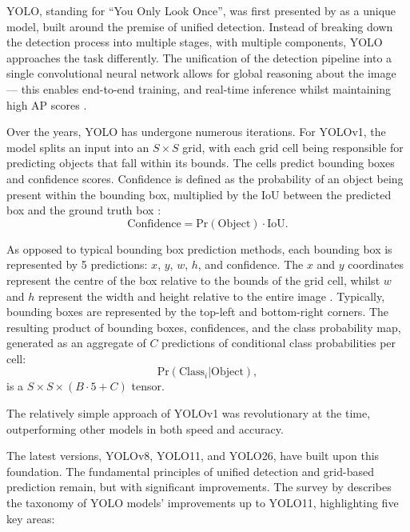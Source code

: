 YOLO, standing for \enquote{You Only Look Once}, was first presented by
\citet{redmon2016lookonceunifiedrealtime} as a unique model, built around the
premise of unified detection. Instead of breaking down the detection process
into multiple stages, with multiple components, YOLO approaches the task
differently. The unification of the detection pipeline into a single
convolutional neural network allows for global reasoning about the image ---
this enables end-to-end training, and real-time inference whilst maintaining
high AP scores \citep{redmon2016lookonceunifiedrealtime}.

Over the years, YOLO has undergone numerous iterations. For YOLOv1, the model
splits an input into an $S \times S$ grid, with each grid cell being
responsible for predicting objects that fall within its bounds. The cells
predict bounding boxes and confidence scores. Confidence is defined as the
probability of an object being present within the bounding box, multiplied by
the IoU between the predicted box and the ground truth box
\citep{redmon2016lookonceunifiedrealtime}: $$\textrm{Confidence} =
	\textrm{Pr}(\textrm{Object}) \cdot \textrm{IoU}.$$

As opposed to typical bounding box prediction methods, each bounding box is
represented by 5 predictions: $x$, $y$, $w$, $h$, and confidence. The $x$ and
$y$ coordinates represent the centre of the box relative to the bounds of the
grid cell, whilst $w$ and $h$ represent the width and height relative to the
entire image \citep{redmon2016lookonceunifiedrealtime}. Typically, bounding
boxes are represented by the top-left and bottom-right corners. The resulting
product of bounding boxes, confidences, and the class probability map,
generated as an aggregate of $C$ predictions of conditional class probabilities
per cell: $$\textrm{Pr}(\textrm{Class}_i | \textrm{Object}),$$ is a $S \times S
	\times (B \cdot 5 + C)$ tensor.

The relatively simple approach of YOLOv1 was revolutionary at the time,
outperforming other models in both speed and accuracy.

The latest versions, YOLOv8, YOLO11, and YOLO26, have built upon this
foundation. The fundamental principles of unified detection and grid-based
prediction remain, but with significant improvements. The survey by
\citet{kotthapalli2025yolov1yolov11comprehensivesurvey} describes the taxonomy
of YOLO models' improvements up to YOLO11, highlighting five key areas:

